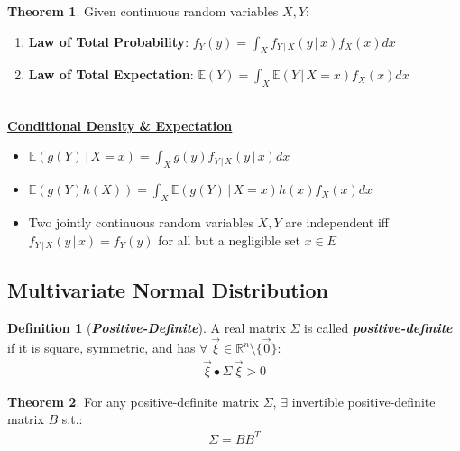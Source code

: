 \documentclass[12pt]{extarticle}
\newcommand{\pstart}[0]{\noindent}
\newcommand{\newp}[0]{~\\\pstart}
\newcommand{\term}[1]{\textbf{\textit{#1}}}
\newcommand{\titleul}[1]{\pstart\textbf{\ul{#1}}}
\theoremstyle{definition}
\newtheorem*{definition}{Definition}
\newtheorem*{theorem}{Theorem}
\theoremstyle{remark}
\newcommand{\cond}[2]{#1\,\vert\,#2}
\newcommand{\expected}[1]{\mathbb{E}\left(#1\right)}
\begin{document}
\vspace{2pt}
\begin{theorem}
    Given continuous random variables $X,Y$: \begin{enumerate}
        \item \textbf{Law of Total Probability}: $f_Y(y)=\int_X 
f_{\cond{Y}{X}}(\cond{y}{x})f_X(x)dx$
        \item \textbf{Law of Total Expectation}: $\expected{Y}=\int_X 
\expected{\cond{Y}{X=x}}f_X(x)dx$
    \end{enumerate}
\end{theorem}

\newp
\titleul{Conditional Density \& Expectation}
\begin{itemize}
    \item $\expected{\cond{g(Y)}{X=x}}=\int_X 
g(y)f_{\cond{Y}{X}}(\cond{y}{x})dx$
    \item 
$\expected{g(Y)h(X)}=\int_X\expected{\cond{g(Y)}{X=x}}h(x)f_X(x)dx$
    \item Two jointly continuous random variables $X,Y$ are independent 
iff $f_{\cond{Y}{X}}(\cond{y}{x})=f_Y(y)$ for all but a negligible set 
$x\in E$
\end{itemize}

\subsection{Multivariate Normal Distribution}
\begin{definition}[\term{Positive-Definite}]
    A real matrix $\Sigma$ is called \term{positive-definite} if it is 
square, symmetric, and has 
$\forall\;\Vec{\xi}\in\mathbb{R}^n\setminus\{\Vec{0}\}$: \begin{align*}
        \Vec{\xi}\bullet\Sigma\,\Vec{\xi}>0
    \end{align*}
\end{definition}

\begin{theorem}
    For any positive-definite matrix $\Sigma$, $\exists$ invertible 
positive-definite matrix $B$ s.t.: \begin{align*}
        \Sigma=BB^T
    \end{align*}
\end{theorem}
\end{document}
